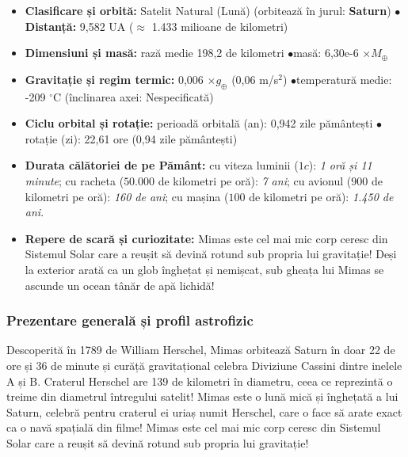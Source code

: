 \begin{tcolorbox}[orbitardata, title={\textbf{Repere esențiale: Mimas}}]
\small
\begin{itemize}[leftmargin=1.4em, itemsep=2pt, topsep=2pt]
  \item \textbf{Clasificare și orbită:} Satelit Natural (Lună) (orbitează în jurul: \textbf{Saturn}) \quad$\bullet$\quad \textbf{Distanță:} 9,582 UA ($\approx$ 1.433 milioane de kilometri)
  \item \textbf{Dimensiuni și masă:} rază medie 198,2 de kilometri \quad$\bullet$\quad masă: 6,30e-6 $\times M_\oplus$
  \item \textbf{Gravitație și regim termic:} 0,006 $\times g_\oplus$ (0,06 m/s$^2$) \quad$\bullet$\quad temperatură medie: -209 $^\circ$C (înclinarea axei: Nespecificată)
  \item \textbf{Ciclu orbital și rotație:} perioadă orbitală (an): 0,942 zile pământești \quad$\bullet$\quad rotație (zi): 22,61 ore (0,94 zile pământești)
  \item \textbf{Durata călătoriei de pe Pământ:} cu viteza luminii ($1c$): \emph{1 oră și 11 minute}; cu racheta ($50.000$ de kilometri pe oră): \emph{7 ani}; cu avionul ($900$ de kilometri pe oră): \emph{160 de ani}; cu mașina ($100$ de kilometri pe oră): \emph{1.450 de ani}.
  \item \textbf{Repere de scară și curiozitate:} Mimas este cel mai mic corp ceresc din Sistemul Solar care a reușit să devină rotund sub propria lui gravitație! Deși la exterior arată ca un glob înghețat și nemișcat, sub gheața lui Mimas se ascunde un ocean tânăr de apă lichidă!
\end{itemize}
\end{tcolorbox}

\subsubsection*{Prezentare generală și profil astrofizic}
Descoperită în 1789 de William Herschel, Mimas orbitează Saturn în doar 22 de ore și 36 de minute și curăță gravitațional celebra Diviziune Cassini dintre inelele A și B. Craterul Herschel are 139 de kilometri în diametru, ceea ce reprezintă o treime din diametrul întregului satelit! Mimas este o lună mică și înghețată a lui Saturn, celebră pentru craterul ei uriaș numit Herschel, care o face să arate exact ca o navă spațială din filme! Mimas este cel mai mic corp ceresc din Sistemul Solar care a reușit să devină rotund sub propria lui gravitație!

